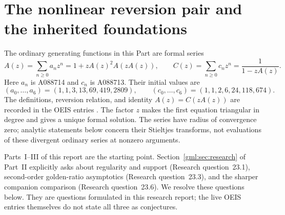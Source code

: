 \documentclass[11pt]{article}
\numberwithin{equation}{section}
\theoremstyle{definition}
\theoremstyle{remark}
\begin{document}
\section{The nonlinear reversion pair and the inherited foundations}
\label{gdy:gold:setting}

The ordinary generating functions in this Part are formal series
\begin{equation}\label{gdy:gold:formal}
 A(z)=\sum_{n\ge0}a_nz^n=1+zA(z)^2A(zA(z)),
 \qquad C(z)=\sum_{n\ge0}c_nz^n=\frac1{1-zA(z)}.
\end{equation}
Here $a_n$ is A088714 and $c_n$ is A088713. Their initial values are
\[
 (a_0,\ldots,a_6)=(1,1,3,13,69,419,2809),\qquad
 (c_0,\ldots,c_6)=(1,1,2,6,24,118,674).
\]
The definitions, reversion relation, and identity $A(z)=C(zA(z))$
are recorded in the OEIS entries \cite{oeis-a088714,oeisC}.
The factor $z$ makes the first equation triangular in degree and gives
a unique formal solution. The series have radius of convergence zero;
analytic statements below concern their Stieltjes transforms, not evaluations
of these divergent ordinary series at nonzero arguments.

Parts~I--III of this report are the starting point.
Section~\ref{gml:sec:research} of Part~II explicitly asks about regularity
and support (Research question~23.1), second-order golden-ratio asymptotics
(Research question~23.3), and the sharper companion comparison (Research
question~23.6). We resolve these questions below.
They are questions formulated in this research report; the live OEIS entries
themselves do not state all three as conjectures.
\end{document}
